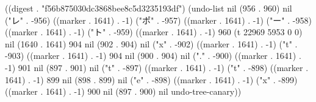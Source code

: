 
((digest . "f56b875030dc3868bee8c5d3235193df") (undo-list nil (956 . 960) nil ("レ" . -956) ((marker . 1641) . -1) ("ポ" . -957) ((marker . 1641) . -1) ("ー" . -958) ((marker . 1641) . -1) ("ト" . -959) ((marker . 1641) . -1) 960 (t 22969 5953 0 0) nil (1640 . 1641) 904 nil (902 . 904) nil ("x" . -902) ((marker . 1641) . -1) ("t" . -903) ((marker . 1641) . -1) 904 nil (900 . 904) nil ("." . -900) ((marker . 1641) . -1) 901 nil (897 . 901) nil ("t" . -897) ((marker . 1641) . -1) ("t" . -898) ((marker . 1641) . -1) 899 nil (898 . 899) nil ("e" . -898) ((marker . 1641) . -1) ("x" . -899) ((marker . 1641) . -1) 900 nil (897 . 900) nil undo-tree-canary))
